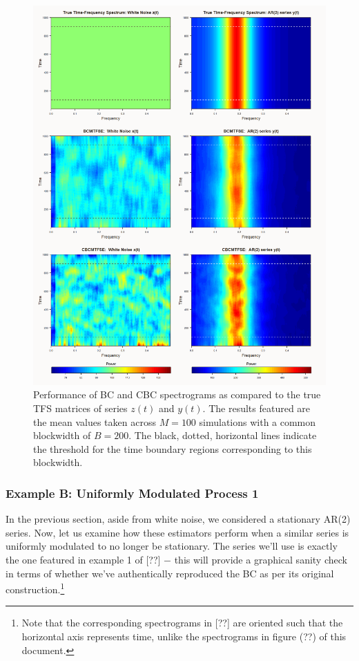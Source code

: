 \documentclass{article}
\begin{document}
\begin{figure}
    \centering
    \includegraphics[width=\linewidth]{Fig/sgrams_Noise-AR2_B200_letterbox.png}
    \caption{Performance of BC and CBC spectrograms as compared to the true TFS matrices of series $z(t)$ and $y(t)$. The results featured are the mean values taken across $M=100$ simulations with a common blockwidth of $B=200$. The black, dotted, horizontal lines indicate the threshold for the time boundary regions corresponding to this blockwidth.}
    \label{fig:1}
\end{figure}

\subsubsection{Example B: Uniformly Modulated Process 1}
In the previous section, aside from white noise, we considered a stationary AR(2) series. Now, let us examine how these estimators perform when a similar series is uniformly modulated to no longer be stationary. The series we'll use is exactly the one featured in example 1 of [??] $-$ this will provide a graphical sanity check in terms of whether we've authentically reproduced the BC as per its original construction.\footnote{Note that the corresponding spectrograms in [??] are oriented such that the horizontal axis represents time, unlike the spectrograms in figure (??) of this document.}
\end{document}
